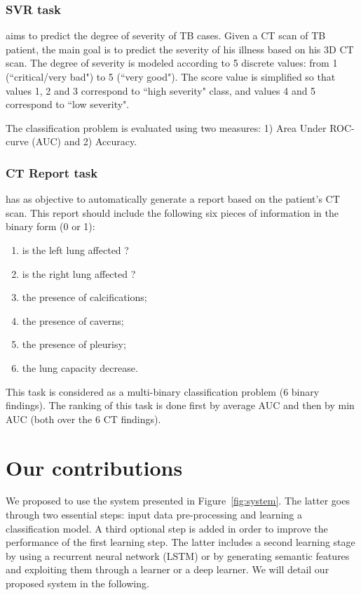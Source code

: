 \documentclass{llncs}
\begin{document}
\subsubsection{SVR task}
aims to predict the degree of severity of TB cases. Given a CT scan of TB patient, the main goal is to predict the severity of his illness based on his 3D CT scan. The degree of severity is modeled according to 5 discrete values: from 1 (``critical/very bad") to 5 (``very good"). The score value is simplified so that values 1, 2 and 3 correspond to ``high severity" class, and values 4 and 5 correspond to ``low severity".

The classification problem is evaluated using two measures: 1) Area Under ROC-curve (AUC) and 2) Accuracy. 

\subsubsection{CT Report task} has as objective to automatically generate a report based on the patient's CT scan. This report should include the following six pieces of information in the binary form (0 or 1):
\begin{enumerate}
 \item is the left lung affected ?
 \item is the right lung affected ? 
\item the presence of calcifications;
 \item the presence of caverns;
  \item the presence of pleurisy;
 \item the lung capacity decrease.
\end{enumerate}

This task is considered as a multi-binary classification problem (6 binary findings). The ranking of this task is done first by average AUC and then by min AUC (both over the 6 CT findings).

\section{Our contributions}
\label{contribution}
We proposed to use the system presented in Figure~\ref{fig:system}. The latter goes through two essential steps: input data pre-processing and learning a classification model. A third optional step is added in order to improve the performance of the first learning step. The latter includes a second learning stage by using a recurrent neural network (LSTM) or by generating semantic features and exploiting them through a learner or a deep learner. We will detail our proposed system in the following.
\end{document}

